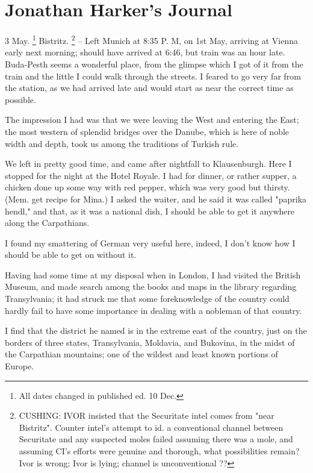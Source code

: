\chapter{Jonathan Harker's Journal}

3 May.
\footnote{All dates changed in published ed. 10 Dec.}
Bistritz.
\footnote{CUSHING: IVOR insisted that the Securitate intel comes from "near Bistritz". Counter intel's attempt to id. a conventional channel between Securitate and any suspected moles failed assuming there was a mole, and assuming CI's efforts were genuine and thorough, what possibilities remain? Ivor is wrong; Ivor is lying; channel is unconventional ??}
-- Left Munich at 8:35 P. M, on 1st May, arriving at Vienna early next morning; should have arrived at 6:46, but train was an hour late. Buda-Pesth seems a wonderful place, from the glimpse which I got of it from the train and the little I could walk through the streets. I feared to go very far from the station, as we had arrived late and would start as near the correct time as possible. 

The impression I had was that we were leaving the West and entering the East; the most western of splendid bridges over the Danube, which is here of noble width and depth, took us among the traditions of Turkish rule. 

We left in pretty good time, and came after nightfall to Klausenburgh. Here I stopped for the night at the Hotel Royale. I had for dinner, or rather supper, a chicken done up some way with red pepper, which was very good but thirsty. (Mem. get recipe for Mina.) I asked the waiter, and he said it was called "paprika hendl," and that, as it was a national dish, I should be able to get it anywhere along the Carpathians. 

I found my smattering of German very useful here, indeed, I don't know how I should be able to get on without it. 

Having had some time at my disposal when in London, I had visited the British Museum, and made search among the books and maps in the library regarding Transylvania; it had struck me that some foreknowledge of the country could hardly fail to have some importance in dealing with a nobleman of that country. 

I find that the district he named is in the extreme east of the country, just on the borders of three states, Transylvania, Moldavia, and Bukovina, in the midst of the Carpathian mountains; one of the wildest and least known portions of Europe. 

